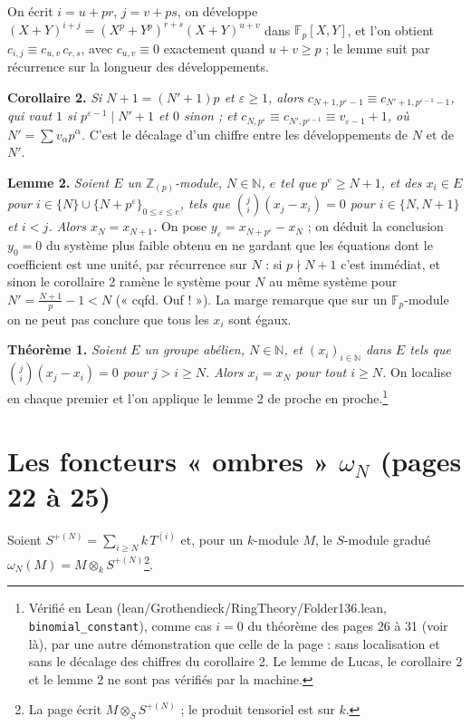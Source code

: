 \documentclass[11pt,a4paper]{article}
\begin{document}
On écrit $i = u + pr$, $j = v + ps$, on développe $(X+Y)^{i+j} =
(X^p+Y^p)^{r+s}(X+Y)^{u+v}$ dans $\mathbb{F}_p[X,Y]$, et l'on obtient
$c_{i,j} \equiv c_{u,v}\, c_{r,s}$, avec $c_{u,v} \equiv 0$ exactement quand
$u + v \geq p$ ; le lemme suit par récurrence sur la longueur des
développements.

\textbf{Corollaire 2.} \emph{Si $N + 1 = (N'+1)p$ et $\varepsilon \geq 1$, alors
$c_{N+1, p^\varepsilon - 1} \equiv c_{N'+1, p^{\varepsilon-1}-1}$, qui vaut $1$
si $p^{\varepsilon-1} \mid N'+1$ et $0$ sinon ; et $c_{N, p^\varepsilon} \equiv
c_{N', p^{\varepsilon-1}} \equiv v_{\varepsilon-1} + 1$, où $N' = \sum
v_\alpha p^\alpha$.} C'est le décalage d'un chiffre entre les développements
de $N$ et de $N'$.

\textbf{Lemme 2.} \emph{Soient $E$ un $\mathbb{Z}_{(p)}$-module, $N \in
\mathbb{N}$, $e$ tel que $p^e \geq N+1$, et des $x_i \in E$ pour $i \in \{N\}
\cup \{N + p^\varepsilon\}_{0 \leq \varepsilon \leq e}$, tels que
$\binom{j}{i}(x_j - x_i) = 0$ pour $i \in \{N, N+1\}$ et $i < j$. Alors $x_N =
x_{N+1}$.} On pose $y_\varepsilon = x_{N+p^\varepsilon} - x_N$ ; on déduit la
conclusion $y_0 = 0$ du système plus faible obtenu en ne gardant que les
équations dont le coefficient est une unité, par récurrence sur $N$ : si $p
\nmid N+1$ c'est immédiat, et sinon le corollaire 2 ramène le système pour $N$
au même système pour $N' = \frac{N+1}{p} - 1 < N$ (« cqfd. Ouf ! »). La marge
remarque que sur un $\mathbb{F}_p$-module on ne peut pas conclure que tous les
$x_i$ sont égaux.

\textbf{Théorème 1.} \emph{Soient $E$ un groupe abélien, $N \in \mathbb{N}$, et
$(x_i)_{i \in \mathbb{N}}$ dans $E$ tels que $\binom{j}{i}(x_j - x_i) = 0$ pour
$j > i \geq N$. Alors $x_i = x_N$ pour tout $i \geq N$.} On localise en chaque
premier et l'on applique le lemme 2 de proche en proche.\footnote{Vérifié en
Lean (lean/Grothendieck/RingTheory/Folder136.lean, \texttt{binomial\_constant}), comme
cas $i = 0$ du théorème des pages 26 à 31 (voir là), par une autre
démonstration que celle de la page : sans localisation et sans le décalage
des chiffres du corollaire 2. Le lemme de Lucas, le corollaire 2 et le
lemme 2 ne sont pas vérifiés par la machine.}

\section*{Les foncteurs « ombres » $\omega_N$ (pages 22 à 25)}

Soient $S^{+(N)} = \sum_{i \geq N} k\, T^{(i)}$ et, pour un $k$-module $M$,
le $S$-module gradué $\omega_N(M) = M \otimes_k S^{+(N)}$\footnote{La page écrit
$M \otimes_S S^{+(N)}$ ; le produit tensoriel est sur $k$.}.
\end{document}

